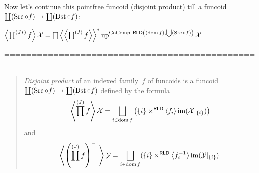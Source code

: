 Now let's continue this pointfree funcoid (disjoint product) till
a funcoid $\coprod(\operatorname{Src}\circ f)\to\coprod(\operatorname{Dst}\circ f)$:

$\left\langle \prod^{(J\ast)} f\right\rangle\mathcal{X} =
\bigsqcap\left\langle \left\langle \prod^{(J)}f\right\rangle\right\rangle ^{\ast}\operatorname{up}^{\operatorname{CoCompl}\mathsf{RLD}\left((\operatorname{dom} f),\bigcup(\operatorname{Src}\circ f)\right)}\mathcal{X}
$

==================================================

\begin{quotation}
\begin{defn}
\emph{Disjoint product} of an indexed family~$f$ of funcoids is
a funcoid $\coprod(\operatorname{Src}\circ f)\to\coprod(\operatorname{Dst}\circ f)$ defined by the formula
\[
\supfun{\prod^{(J)}f} \mathcal{X} =
\bigsqcup_{i\in\dom f}
\left(\{i\}\times^{\mathsf{RLD}}\supfun{f_i}\im(\mathcal{X}|_{\{i\}})\right)
\]
and
\[
\supfun{\left(\prod^{(J)}f\right)^{-1}} \mathcal{Y} =
\bigsqcup_{i\in\dom f}
(\{i\}\times^{\mathsf{RLD}}\supfun{f_i^{-1}}\im(\mathcal{Y}|_{\{i\}}).
\]
\end{defn}
\end{quotation}

